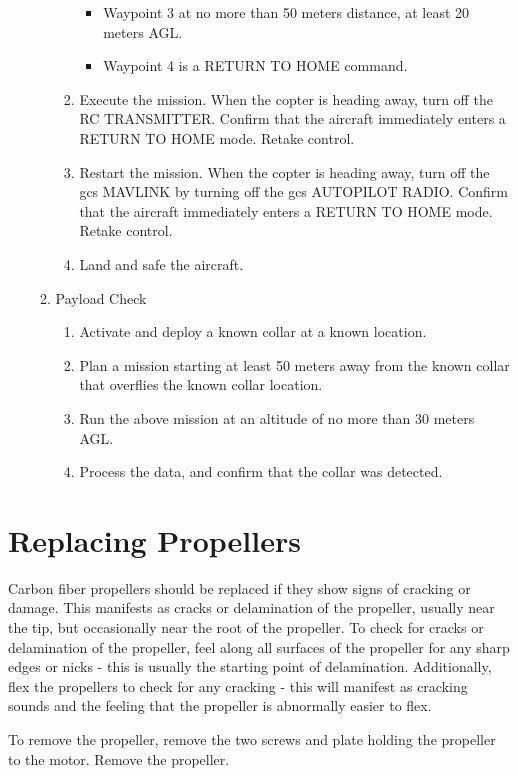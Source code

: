 \documentclass{report}
\begin{document}
\begin{enumerate}
\begin{enumerate}
\begin{enumerate}
\begin{itemize}
									\item Waypoint 3 at no more than 50 meters distance, at least 20 meters AGL.
									\item Waypoint 4 is a RETURN TO HOME command.
								\end{itemize}
							\item Execute the mission.  When the copter is heading away, turn off the RC TRANSMITTER.  Confirm that the aircraft immediately enters a RETURN TO HOME mode.  Retake control.
							\item Restart the mission.  When the copter is heading away, turn off the \gls{gcs} MAVLINK by turning off the \gls{gcs} AUTOPILOT RADIO.  Confirm that the aircraft immediately enters a RETURN TO HOME mode.  Retake control.
							\item Land and safe the aircraft.
						\end{enumerate}
					\item Payload Check
						\begin{enumerate}
							\item Activate and deploy a known collar at a known location.
							\item Plan a mission starting at least 50 meters away from the known collar that overflies the known collar location.
							\item Run the above mission at an altitude of no more than 30 meters AGL.
							\item Process the data, and confirm that the collar was detected.
						\end{enumerate}
				\end{enumerate}
		\end{enumerate}
	\section{Replacing Propellers}
		Carbon fiber propellers should be replaced if they show signs of cracking or damage.  This manifests as cracks or delamination of the propeller, usually near the tip, but occasionally near the root of the propeller.  To check for cracks or delamination of the propeller, feel along all surfaces of the propeller for any sharp edges or nicks - this is usually the starting point of delamination.  Additionally, flex the propellers to check for any cracking - this will manifest as cracking sounds and the feeling that the propeller is abnormally easier to flex.

		To remove the propeller, remove the two screws and plate holding the propeller to the motor.  Remove the propeller.
\end{document}
